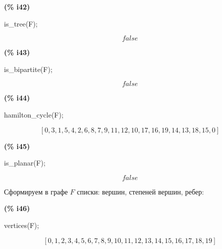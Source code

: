 \documentclass[fleqn]{article}
\begin{document}
\noindent
\begin{minipage}[t]{4.000000em}\color{red}\bfseries
(\% i42)	
\end{minipage}
\begin{minipage}[t]{\textwidth}\color{blue}
is\_tree(F);
\end{minipage}
\[\displaystyle \tag{\% o42} 
false\mbox{}
\]


\noindent
\begin{minipage}[t]{4.000000em}\color{red}\bfseries
(\% i43)	
\end{minipage}
\begin{minipage}[t]{\textwidth}\color{blue}
is\_bipartite(F);\\

\end{minipage}
\[\displaystyle \tag{\% o43} 
false\mbox{}
\]


\noindent
\begin{minipage}[t]{4.000000em}\color{red}\bfseries
(\% i44)	
\end{minipage}
\begin{minipage}[t]{\textwidth}\color{blue}
hamilton\_cycle(F);
\end{minipage}
\[\displaystyle \tag{\% o44} 
\left[ 0\operatorname{,}3\operatorname{,}1\operatorname{,}5\operatorname{,}4\operatorname{,}2\operatorname{,}6\operatorname{,}8\operatorname{,}7\operatorname{,}9\operatorname{,}11\operatorname{,}12\operatorname{,}10\operatorname{,}17\operatorname{,}16\operatorname{,}19\operatorname{,}14\operatorname{,}13\operatorname{,}18\operatorname{,}15\operatorname{,}0\right] \mbox{}
\]


\noindent
\begin{minipage}[t]{4.000000em}\color{red}\bfseries
(\% i45)	
\end{minipage}
\begin{minipage}[t]{\textwidth}\color{blue}
is\_planar(F);
\end{minipage}
\[\displaystyle \tag{\% o45} 
false\mbox{}
\]

Сформируем в графе $F$ списки: вершин, степеней вершин, ребер:\\
\noindent
\begin{minipage}[t]{4.000000em}\color{red}\bfseries
(\% i46)	
\end{minipage}
\begin{minipage}[t]{\textwidth}\color{blue}
vertices(F);
\end{minipage}
\[\displaystyle \tag{\% o46} 
\left[ 0\operatorname{,}1\operatorname{,}2\operatorname{,}3\operatorname{,}4\operatorname{,}5\operatorname{,}6\operatorname{,}7\operatorname{,}8\operatorname{,}9\operatorname{,}10\operatorname{,}11\operatorname{,}12\operatorname{,}13\operatorname{,}14\operatorname{,}15\operatorname{,}16\operatorname{,}17\operatorname{,}18\operatorname{,}19\right] \mbox{}
\]
\end{document}
